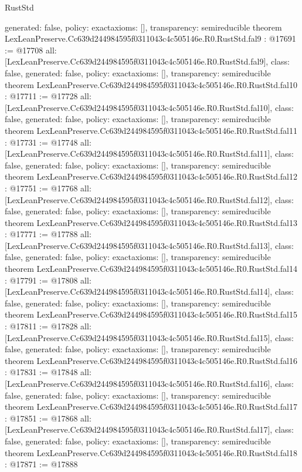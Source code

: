 \begin{lexlean}{RustStd}
\begin{coremodule}
{  generated: false,
  policy: exact{axioms: []},
  transparency: semireducible
}
theorem LexLeanPreserve.Cc639d244984595f0311043c4c505146e.R0.RustStd.fal9 : @17691 := @17708 {
  all: [LexLeanPreserve.Cc639d244984595f0311043c4c505146e.R0.RustStd.fal9],
  class: false,
  generated: false,
  policy: exact{axioms: []},
  transparency: semireducible
}
theorem LexLeanPreserve.Cc639d244984595f0311043c4c505146e.R0.RustStd.fal10 : @17711 := @17728 {
  all: [LexLeanPreserve.Cc639d244984595f0311043c4c505146e.R0.RustStd.fal10],
  class: false,
  generated: false,
  policy: exact{axioms: []},
  transparency: semireducible
}
theorem LexLeanPreserve.Cc639d244984595f0311043c4c505146e.R0.RustStd.fal11 : @17731 := @17748 {
  all: [LexLeanPreserve.Cc639d244984595f0311043c4c505146e.R0.RustStd.fal11],
  class: false,
  generated: false,
  policy: exact{axioms: []},
  transparency: semireducible
}
theorem LexLeanPreserve.Cc639d244984595f0311043c4c505146e.R0.RustStd.fal12 : @17751 := @17768 {
  all: [LexLeanPreserve.Cc639d244984595f0311043c4c505146e.R0.RustStd.fal12],
  class: false,
  generated: false,
  policy: exact{axioms: []},
  transparency: semireducible
}
theorem LexLeanPreserve.Cc639d244984595f0311043c4c505146e.R0.RustStd.fal13 : @17771 := @17788 {
  all: [LexLeanPreserve.Cc639d244984595f0311043c4c505146e.R0.RustStd.fal13],
  class: false,
  generated: false,
  policy: exact{axioms: []},
  transparency: semireducible
}
theorem LexLeanPreserve.Cc639d244984595f0311043c4c505146e.R0.RustStd.fal14 : @17791 := @17808 {
  all: [LexLeanPreserve.Cc639d244984595f0311043c4c505146e.R0.RustStd.fal14],
  class: false,
  generated: false,
  policy: exact{axioms: []},
  transparency: semireducible
}
theorem LexLeanPreserve.Cc639d244984595f0311043c4c505146e.R0.RustStd.fal15 : @17811 := @17828 {
  all: [LexLeanPreserve.Cc639d244984595f0311043c4c505146e.R0.RustStd.fal15],
  class: false,
  generated: false,
  policy: exact{axioms: []},
  transparency: semireducible
}
theorem LexLeanPreserve.Cc639d244984595f0311043c4c505146e.R0.RustStd.fal16 : @17831 := @17848 {
  all: [LexLeanPreserve.Cc639d244984595f0311043c4c505146e.R0.RustStd.fal16],
  class: false,
  generated: false,
  policy: exact{axioms: []},
  transparency: semireducible
}
theorem LexLeanPreserve.Cc639d244984595f0311043c4c505146e.R0.RustStd.fal17 : @17851 := @17868 {
  all: [LexLeanPreserve.Cc639d244984595f0311043c4c505146e.R0.RustStd.fal17],
  class: false,
  generated: false,
  policy: exact{axioms: []},
  transparency: semireducible
}
theorem LexLeanPreserve.Cc639d244984595f0311043c4c505146e.R0.RustStd.fal18 : @17871 := @17888 {
}
\end{coremodule}
\end{lexlean}
